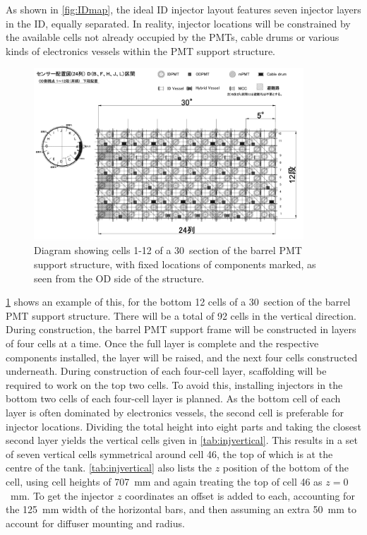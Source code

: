 \documentclass[a4paper,11pt]{article}
\begin{document}
As shown in \cref{fig:IDmap}, the ideal ID injector layout features seven injector layers in the ID, equally separated. In reality, injector locations will be constrained by the available cells not already occupied by the PMTs, cable drums or various kinds of electronics vessels within the PMT support structure. 
\begin{figure}[h]
\centering
\includegraphics[width=0.9\textwidth]{barrelStructureDiagram.png}
\caption{Diagram showing cells 1-12 of a 30\degree\ section of the barrel PMT support structure, with fixed locations of components marked, as seen from the OD side of the structure.}\label{fig:barrelDiagram}
\end{figure}
\cref{fig:barrelDiagram} shows an example of this, for the bottom 12 cells of a 30\degree\ section of the barrel PMT support structure. There will be a total of 92 cells in the vertical direction. During construction, the barrel PMT support frame will be constructed in layers of four cells at a time. Once the full layer is complete and the respective components installed, the layer will be raised, and the next four cells constructed underneath. During construction of each four-cell layer, scaffolding will be required to work on the top two cells. To avoid this, installing injectors in the bottom two cells of each four-cell layer is planned. As the bottom cell of each layer is often dominated by electronics vessels, the second cell is preferable for injector locations. Dividing the total height into eight parts and taking the closest second layer yields the vertical cells given in \cref{tab:injvertical}. This results in a set of seven vertical cells symmetrical around cell 46, the top of which is at the centre of the tank. \cref{tab:injvertical} also lists the $z$ position of the bottom of the cell, using cell heights of 707~mm and again treating the top of cell 46 as $z=0$~mm. To get the injector $z$ coordinates an offset is added to each, accounting for the 125~mm width of the horizontal bars, and then assuming an extra 50~mm to account for diffuser mounting and radius.
\end{document}
